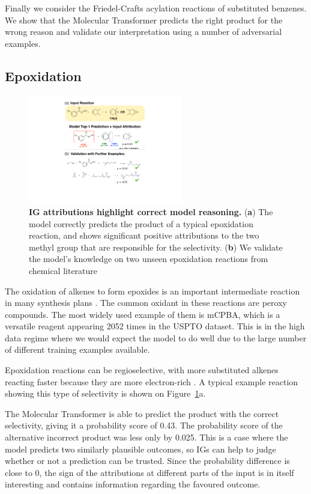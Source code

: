 Finally we consider the Friedel-Crafts acylation reactions of substituted benzenes. We show that the Molecular Transformer predicts the right product for the wrong reason and validate our interpretation using a number of adversarial examples.

\subsection{Epoxidation}

\begin{figure}[ht!]
    \centering
    \includegraphics[width=0.6\textwidth]{Chapters/Transformer/Figs/epoxidation.pdf}
    \caption{\label{fig:epoxide} \textbf{IG attributions highlight correct model reasoning.} (\textbf{a}) The model correctly predicts the product of a typical epoxidation reaction, and shows significant positive attributions to the two methyl group that are responsible for the selectivity. (\textbf{b}) We validate the model's knowledge on two unseen epoxidation reactions from chemical literature~\cite{Lluch1993}}
\end{figure}

The oxidation of alkenes to form epoxides is an important intermediate reaction in many synthesis plans \cite{Clayden2012}. The common oxidant in these reactions are peroxy compounds. The most widely used example of them is mCPBA, which is a versatile reagent appearing 2052 times in the USPTO dataset. This is in the high data regime where we would expect the model to do well due to the large number of different training examples available. 

Epoxidation reactions can be regioselective, with more substituted alkenes reacting faster because they are more electron-rich \cite{Clayden2012}. A typical example reaction showing this type of selectivity is shown on Figure~\ref{fig:epoxide}a. 

The Molecular Transformer is able to predict the product with the correct selectivity, giving it a probability score of 0.43. The probability score of the alternative incorrect product was less only by 0.025. This is a case where the model predicts two similarly plausible outcomes, so IGs can help to judge whether or not a prediction can be trusted. Since the probability difference is close to 0, the sign of the attributions at different parts of the input is in itself interesting and contains information regarding the favoured outcome. 

